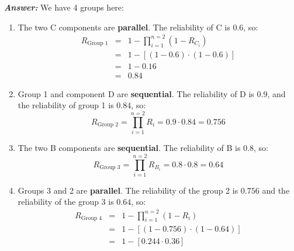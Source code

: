 \begin{enumerate}
    \textcolor{Green3}{\textbf{\emph{Answer:}}} We have 4 groups here:
    \begin{enumerate}[label=Group \arabic*., labelwidth=4em, labelsep=1em, leftmargin=!]
        \item The two C components are \textbf{parallel}. The reliability of C is $0.6$, so:
        \begin{equation*}
            \begin{array}{rcl}
                R_{\text{Group 1}} &=& 1 - \displaystyle\prod_{i=1}^{n=2} \left(1 - R_{C_i}\right) \\ [1.5em]
                &=& 1 - \left[
                    \left(1 - 0.6\right)
                    \cdot
                    \left(1 - 0.6\right)
                \right] \\ [.5em]
                &=& 1 - 0.16 \\ [.5em]
                &=& 0.84
            \end{array}
        \end{equation*}
        \item Group 1 and component D are \textbf{sequential}. The reliability of D is $0.9$, and the reliability of group 1 is $0.84$, so:
        \begin{equation*}
            R_{\text{Group 2}} = \displaystyle\prod_{i=1}^{n=2} R_{i} = 0.9 \cdot 0.84 = 0.756
        \end{equation*}
        \item The two B components are \textbf{sequential}. The reliability of B is $0.8$, so:
        \begin{equation*}
            R_{\text{Group 3}} = \displaystyle\prod_{i=1}^{n=2} R_{B_i} = 0.8 \cdot 0.8 = 0.64
        \end{equation*}
        \item Groups 3 and 2 are \textbf{parallel}. The reliability of the group 2 is $0.756$ and the reliability of the group 3 is $0.64$, so:
        \begin{equation*}
            \begin{array}{rcl}
                R_{\text{Group 4}} &=& 1 - \displaystyle\prod_{i=1}^{n=2} \left(1 - R_{i}\right) \\ [1.5em]
                &=& 1 - \left[
                    \left(1 - 0.756\right)
                    \cdot
                    \left(1 - 0.64\right)
                \right] \\ [.5em]
                &=& 1 - \left[ 0.244 \cdot 0.36 \right] \\ [.5em]

\end{array}
\end{equation*}
\end{enumerate}
\end{enumerate}
